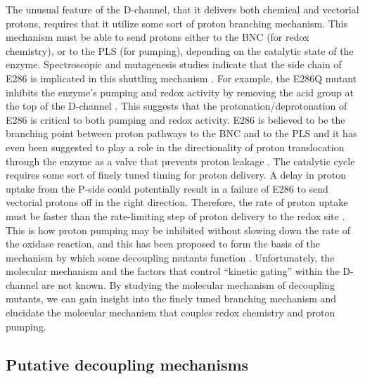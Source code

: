 The unusual feature of the D-channel, that it delivers both chemical and vectorial protons, requires that it utilize some sort of proton branching mechanism. This mechanism must be able to send protons either to the BNC (for redox chemistry), or to the PLS (for pumping), depending on the catalytic state of the enzyme. Spectroscopic and mutagenesis studies indicate that the side chain of E286 is implicated in this shuttling mechanism \cite{Pomes:1998p5611,Namslauer:2003p6853,Gennis:2004p10239}. For example, the E286Q mutant inhibits the enzyme's pumping and redox activity by removing the acid group at the top of the D-channel \cite{Adelroth:1997p5385}. This suggests that the protonation/deprotonation of E286 is critical to both pumping and redox activity. E286 is believed to be the branching point between proton pathways to the BNC and to the PLS \cite{Riistama:1997p8271,Adelroth:2000p5278} and it has even been suggested to play a role in the directionality of proton translocation through the enzyme as a valve that prevents proton leakage \cite{Siegbahn:2007p5285}. The catalytic cycle requires some sort of finely tuned timing for proton delivery. A delay in proton uptake from the P-side could potentially result in a failure of E286 to send vectorial protons off in the right direction. Therefore, the rate of proton uptake must be faster than the rate-limiting step of proton delivery to the redox site \cite{Zhu:2010p8237}. This is how proton pumping may be inhibited without slowing down the rate of the oxidase reaction, and this has been proposed to form the basis of the mechanism by which some decoupling mutants function \cite{Zhu:2010p8237}. Unfortunately, the molecular mechanism and the factors that control ``kinetic gating'' within the D-channel are not known. By studying the molecular mechanism of decoupling mutants, we can gain insight into the finely tuned branching mechanism and elucidate the molecular mechanism that couples redox chemistry and proton pumping.

\subsection{Putative decoupling mechanisms}

